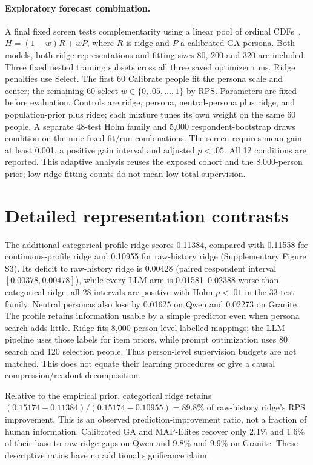 \documentclass[sigconf,anonymous]{aamas}
\begin{document}
\paragraph{Exploratory forecast combination.}
A final fixed screen tests complementarity using a linear pool of ordinal
CDFs~\cite{gneiting2011combining}, $H=(1-w)R+wP$, where $R$ is ridge and $P$
a calibrated-GA persona. Both models, both ridge representations and fitting
sizes 80, 200 and 320 are included. Three fixed nested training subsets cross
all three saved optimizer runs. Ridge penalties use Select. The first 60
Calibrate people fit the persona scale and center; the remaining 60 select
$w\in\{0,.05,\ldots,1\}$ by RPS. Parameters are fixed before evaluation.
Controls are ridge, persona, neutral-persona plus ridge, and population-prior
plus ridge; each mixture tunes its own weight on the same 60 people.
A separate 48-test Holm family and 5,000 respondent-bootstrap draws condition
on the nine fixed fit/run combinations. The screen requires mean gain at least
0.001, a positive gain interval and adjusted $p<.05$. All 12 conditions are
reported. This adaptive analysis reuses the exposed cohort and the 8,000-person
prior; low ridge fitting counts do not mean low total supervision.


\section{Detailed representation contrasts}
The additional categorical-profile ridge scores 0.11384, compared with
0.11558 for continuous-profile ridge and 0.10955 for raw-history ridge
(Supplementary Figure S3). Its deficit to raw-history ridge is
0.00428 (paired respondent interval $[0.00378,0.00478]$), while every LLM
arm is 0.01581--0.02388 worse than categorical ridge; all 28 intervals are
positive with Holm $p<.01$ in the 33-test family. Neutral personas also lose
by 0.01625 on Qwen and 0.02273 on Granite. The profile retains information
usable by a simple predictor even when persona search adds little. Ridge fits
8,000 person-level labelled mappings; the LLM pipeline uses those labels for
item priors, while prompt optimization uses 80 search and 120 selection people.
Thus person-level supervision budgets are not matched. This does
not equate their learning procedures or give a causal compression/readout
decomposition.

Relative to the empirical prior, categorical ridge retains
$(0.15174-0.11384)/(0.15174-0.10955)=89.8\%$ of raw-history ridge's
RPS improvement. This is an observed prediction-improvement ratio, not a
fraction of human information. Calibrated GA and MAP-Elites recover only
2.1\% and 1.6\% of their base-to-raw-ridge gaps on Qwen and 9.8\% and
9.9\% on Granite. These descriptive ratios have no additional significance claim.




\end{document}
